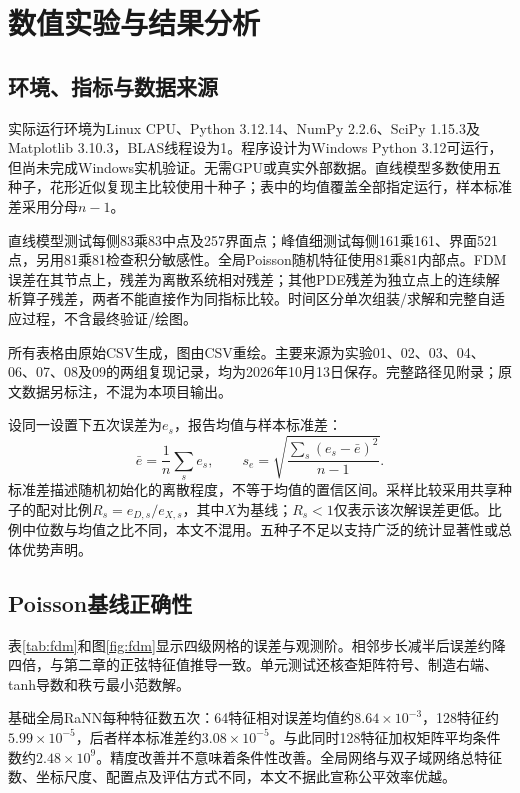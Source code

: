 \chapter{数值实验与结果分析}
\section{环境、指标与数据来源}
实际运行环境为Linux CPU、Python 3.12.14、NumPy 2.2.6、SciPy 1.15.3及Matplotlib 3.10.3，BLAS线程设为1。程序设计为Windows Python 3.12可运行，但尚未完成Windows实机验证。无需GPU或真实外部数据。直线模型多数使用五种子，花形近似复现主比较使用十种子；表中的均值覆盖全部指定运行，样本标准差采用分母$n-1$。

直线模型测试每侧83乘83中点及257界面点；峰值细测试每侧161乘161、界面521点，另用81乘81检查积分敏感性。全局Poisson随机特征使用81乘81内部点。FDM误差在其节点上，残差为离散系统相对残差；其他PDE残差为独立点上的连续解析算子残差，两者不能直接作为同指标比较。时间区分单次组装/求解和完整自适应过程，不含最终验证/绘图。

所有表格由原始CSV生成，图由CSV重绘。主要来源为实验01、02、03、04、06、07、08及09的两组复现记录，均为2026年10月13日保存。完整路径见附录；原文数据另标注，不混为本项目输出。

设同一设置下五次误差为$e_s$，报告均值与样本标准差：
\[\bar e=\frac1n\sum_s e_s,\qquad s_e=\sqrt{\frac{\sum_s(e_s-\bar e)^2}{n-1}}.\]
标准差描述随机初始化的离散程度，不等于均值的置信区间。采样比较采用共享种子的配对比例$R_s=e_{D,s}/e_{X,s}$，其中$X$为基线；$R_s<1$仅表示该次解误差更低。比例中位数与均值之比不同，本文不混用。五种子不足以支持广泛的统计显著性或总体优势声明。

\section{Poisson基线正确性}
表\ref{tab:fdm}和图\ref{fig:fdm}显示四级网格的误差与观测阶。相邻步长减半后误差约降四倍，与第二章的正弦特征值推导一致。单元测试还核查矩阵符号、制造右端、tanh导数和秩亏最小范数解。
\begin{table}[htbp]\centering\caption{Poisson五点差分真实结果}\label{tab:fdm}\end{table}
基础全局RaNN每种特征数五次：64特征相对误差均值约$8.64\times10^{-3}$，128特征约$5.99\times10^{-5}$，后者样本标准差约$3.08\times10^{-5}$。与此同时128特征加权矩阵平均条件数约$2.48\times10^9$。精度改善并不意味着条件性改善。全局网络与双子域网络总特征数、坐标尺度、配置点及评估方式不同，本文不据此宣称公平效率优越。

